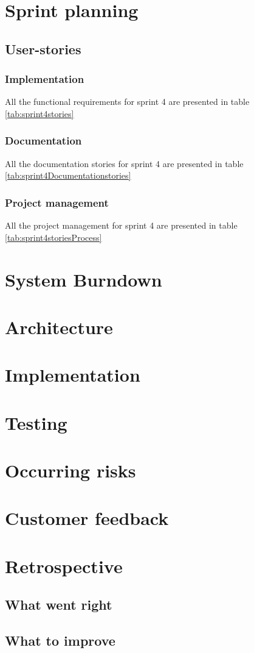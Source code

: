 \section{Sprint planning}
\subsection{User-stories}
\subsubsection*{Implementation}
All the functional requirements for sprint 4 are presented in table \ref{tab:sprint4stories}

\subsubsection*{Documentation}
All the documentation stories for sprint 4 are presented in table \ref{tab:sprint4Documentationstories}

\subsubsection*{Project management}
All the project management for sprint 4 are presented in table \ref{tab:sprint4storiesProcess}


\section{System Burndown}
\section{Architecture}
\section{Implementation}
\section{Testing}
\section{Occurring risks}
\section{Customer feedback}
\section{Retrospective}
\subsection{What went right}
\subsection{What to improve}
